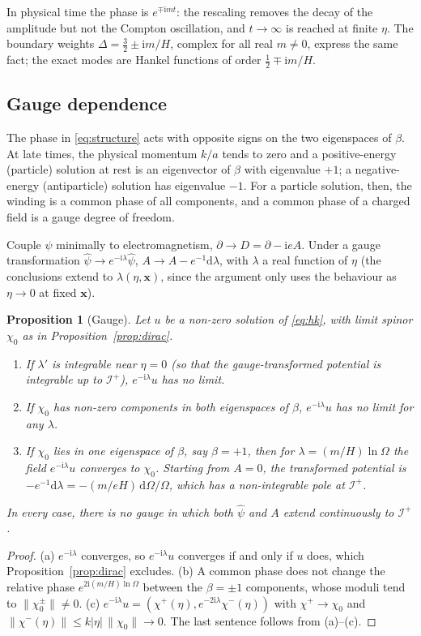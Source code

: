\documentclass[11pt,a4paper]{article}
\newtheorem{proposition}{Proposition}
\theoremstyle{definition}
\newcommand{\scri}{\mathscr{I}^{+}}
\newcommand{\dd}{\mathrm{d}}
\newcommand{\ii}{\mathrm{i}}
\newcommand{\hpsi}{\hat\psi}
\begin{document}
In physical time the phase is $e^{\mp\ii mt}$: the rescaling removes the decay of the amplitude but not the Compton oscillation, and $t\to\infty$ is reached at finite $\eta$. The boundary weights $\Delta=\tfrac32\pm\ii m/H$, complex for all real $m\neq0$, express the same fact; the exact modes are Hankel functions of order $\tfrac12\mp\ii m/H$.

\subsection{Gauge dependence}
\label{sec:gauge}

The phase in \eqref{eq:structure} acts with opposite signs on the two eigenspaces of $\beta$. At late times, the physical momentum $k/a$ tends to zero and a positive-energy (particle) solution at rest is an eigenvector of $\beta$ with eigenvalue $+1$; a negative-energy (antiparticle) solution has eigenvalue $-1$. For a particle solution, then, the winding is a common phase of all components, and a common phase of a charged field is a gauge degree of freedom.

Couple $\psi$ minimally to electromagnetism, $\partial\to D=\partial-\ii eA$. Under a gauge transformation $\hpsi\to e^{-\ii\lambda}\hpsi$, $A\to A-e^{-1}\dd\lambda$, with $\lambda$ a real function of $\eta$ (the conclusions extend to $\lambda(\eta,\mathbf{x})$, since the argument only uses the behaviour as $\eta\to0$ at fixed $\mathbf{x}$).

\begin{proposition}[Gauge]
\label{prop:gauge}
Let $u$ be a non-zero solution of \eqref{eq:hk}, with limit spinor $\chi_{0}$ as in Proposition~\ref{prop:dirac}.
\begin{enumerate}[label=(\alph*)]
\item If $\lambda'$ is integrable near $\eta=0$ (so that the gauge-transformed potential is integrable up to $\scri$), $e^{-\ii\lambda}u$ has no limit.
\item If $\chi_{0}$ has non-zero components in both eigenspaces of $\beta$, $e^{-\ii\lambda}u$ has no limit for any $\lambda$.
\item If $\chi_{0}$ lies in one eigenspace of $\beta$, say $\beta=+1$, then for $\lambda=(m/H)\ln\Omega$ the field $e^{-\ii\lambda}u$ converges to $\chi_{0}$. Starting from $A=0$, the transformed potential is $-e^{-1}\dd\lambda=-(m/eH)\,\dd\Omega/\Omega$, which has a non-integrable pole at $\scri$.
\end{enumerate}
In every case, there is no gauge in which both $\hpsi$ and $A$ extend continuously to $\scri$.
\end{proposition}
\begin{proof}
(a) $e^{-\ii\lambda}$ converges, so $e^{-\ii\lambda}u$ converges if and only if $u$ does, which Proposition~\ref{prop:dirac} excludes. (b) A common phase does not change the relative phase $e^{2\ii(m/H)\ln\Omega}$ between the $\beta=\pm1$ components, whose moduli tend to $\|\chi_{0}^{\pm}\|\neq0$. (c) $e^{-\ii\lambda}u=(\chi^{+}(\eta),e^{-2\ii\lambda}\chi^{-}(\eta))$ with $\chi^{+}\to\chi_{0}$ and $\|\chi^{-}(\eta)\|\le k|\eta|\,\|\chi_{0}\|\to0$. The last sentence follows from (a)--(c).
\end{proof}
\end{document}
